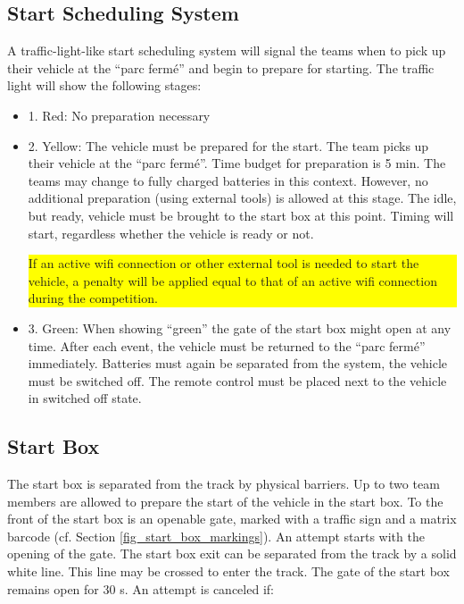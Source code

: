 \subsection{Start Scheduling System}
\label{start_scheduling}

A traffic-light-like start scheduling system will signal the teams when to pick
up their vehicle at the “parc fermé” and begin to prepare for starting. The
traffic light will show the following stages:

\begin{itemize}
	\item 1. Red: No preparation necessary

	\item 2. Yellow: The vehicle must be prepared for the start. The team picks up their vehicle at the “parc fermé”. Time budget for preparation is 5 min. The teams may change to fully charged batteries in this context. However, no additional preparation (using external tools) is allowed at this stage. The idle, but ready, vehicle must be brought to the start box at this point. Timing will start, regardless whether the vehicle is ready or not.\\
	      \colorbox{yellow}{\parbox{0.8\colorboxwidth}{
			      If an active wifi connection or other external tool is needed to start the vehicle, a penalty will be applied equal to that of an active wifi connection during the competition.}}

	\item 3. Green: When showing “green” the gate of the start box might open at any time. After each event, the vehicle must be returned to the “parc fermé” immediately. Batteries must again be separated from the system, the vehicle must be switched off. The remote control must be placed next to the vehicle in switched off state.
\end{itemize}

\subsection{Start Box}
\label{start_box}

The start box is separated from the track by physical barriers. Up to two team
members are allowed to prepare the start of the vehicle in the start box. To
the front of the start box is an openable gate, marked with a traffic sign and
a matrix barcode (cf. Section \ref{fig_start_box_markings}). An attempt starts
with the opening of the gate. The start box exit can be separated from the
track by a solid white line. This line may be crossed to enter the track. The
gate of the start box remains open for 30 s. An attempt is canceled if:

